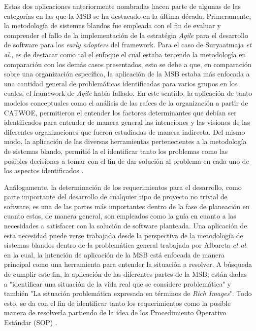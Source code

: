 \documentclass[10pt,letterpaper,twoside,twocolumn]{article}   %
\begin{document}
Estas dos aplicaciones anteriormente nombradas hacen parte de algunas de las categorías en las que la MSB se ha destacado en la última década. Primeramente, la metodología de sistemas blandos fue empleada con el fin de evaluar y comprender el fallo de la implementación de la estratégia \textit{Agile} para el desarrollo de software para los \textit{early adopters} del framework. Para el caso de Suryaatmaja \textit{et al.}, es de destacar como tal el enfoque el cual estaba teniendo la metodología en comparación con los demás casos presentados, esto se debe a que, en comparación sobre una organización específica, la aplicación de la MSB estaba más enfocada a una cantidad general de problemáticas identificadas para varios grupos en los cuales, el framework de \textit{Agile} había fallado. En este sentido, la aplicación de tanto modelos conceptuales como el análisis de las raíces de la organización a partir de CATWOE, permitieron el entender los factores determinantes que debían ser identificados para entender de manera general las intenciones y las visiones de las diferentes organizaciones que fueron estudiadas de manera indirecta. Del mismo modo, la aplicación de las diversas herramientas pertenecientes a la metodología de sistemas blando, permitió la el identificar tanto los problemas como las posibles decisiones a tomar con el fin de dar solución al problema en cada uno de los aspectos identificados \cite{Suryaatmaja[1]}.

Análogamente, la determinación de los requerimientos para el desarrollo, como parte importante del desarrollo de cualquier tipo de proyecto no trivial de software, es una de las partes más importantes dentro de la fase de planeación en cuanto estas, de manera general, son empleados como la guía en cuanto a las necesidades a satisfacer con la solución de software planteada. Una aplicación de esta necesidad puede verse trabajada desde la perspectiva de la metodología de sistemas blandos dentro de la problemática general trabajada por Albareta \textit{et al.} en la cual, la intención de aplicación de la MSB está enfocada de manera principal como una herramienta para entender la situación a resolver. A búsqueda de cumplir este fin, la aplicación de las diferentes partes de la MSB, están dadas a "identificar una situación de la vida real que se considere problemática" y también "La situación problemática expresada en términos de \textit{Rich Images}". Todo esto, se da con el fin de identificar tanto los requerimientos como la posible manera de resolverla partiendo de la idea de los Procedimiento Operativo Estándar (SOP) \cite{Albareta[1]}. 
\end{document}
